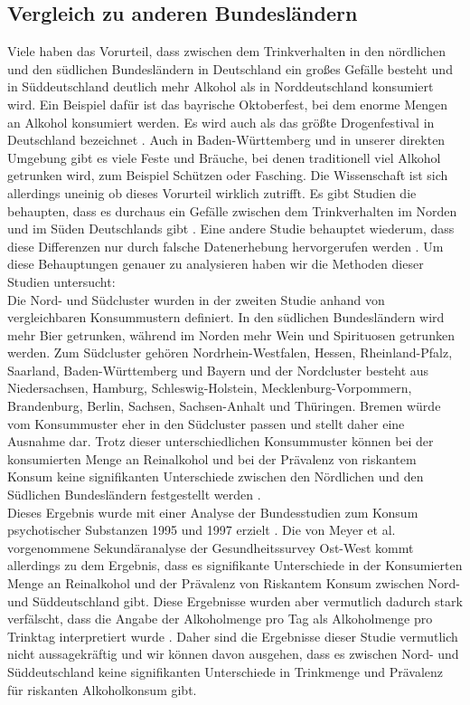 \documentclass[12pt]{article}
\begin{document}
\subsection{Vergleich zu anderen Bundesländern}
Viele haben das Vorurteil, dass zwischen dem Trinkverhalten in den nördlichen und den südlichen Bundesländern in Deutschland ein großes Gefälle besteht und in Süddeutschland deutlich mehr Alkohol als in Norddeutschland konsumiert wird. Ein Beispiel dafür ist das bayrische Oktoberfest, bei dem enorme Mengen an Alkohol konsumiert werden. Es wird auch als das größte Drogenfestival in Deutschland bezeichnet \autocite{effern_munchen_2023}. Auch in Baden-Württemberg und in unserer direkten Umgebung gibt es viele Feste und Bräuche, bei denen traditionell viel Alkohol getrunken wird, zum Beispiel Schützen oder Fasching. Die Wissenschaft ist sich allerdings uneinig ob dieses Vorurteil wirklich zutrifft. Es gibt Studien die behaupten, dass es durchaus ein Gefälle zwischen dem Trinkverhalten im Norden und im Süden Deutschlands gibt \autocite{meyer_regionale_1998}. Eine andere Studie behauptet wiederum, dass diese Differenzen nur durch falsche Datenerhebung hervorgerufen werden \autocite[781]{kraus_einfluss_2001}. Um diese Behauptungen genauer zu analysieren haben wir die Methoden dieser Studien untersucht: \\
Die Nord- und Südcluster wurden in der zweiten Studie anhand von vergleichbaren Konsummustern definiert. In den südlichen Bundesländern wird mehr Bier getrunken, während im Norden mehr Wein und Spirituosen getrunken werden. Zum Südcluster gehören Nordrhein-Westfalen, Hessen, Rheinland-Pfalz, Saarland, Baden-Württemberg und Bayern und der Nordcluster besteht aus Niedersachsen, Hamburg, Schleswig-Holstein, Mecklenburg-Vorpommern, Brandenburg, Berlin, Sachsen, Sachsen-Anhalt und Thüringen. Bremen würde vom Konsummuster eher in den Südcluster passen und stellt daher eine Ausnahme dar. Trotz dieser unterschiedlichen Konsummuster können bei der konsumierten Menge an Reinalkohol und bei der Prävalenz von riskantem Konsum keine signifikanten Unterschiede zwischen den Nördlichen und den Südlichen Bundesländern festgestellt werden \autocite[780]{kraus_einfluss_2001}.\\
Dieses Ergebnis wurde mit einer Analyse der Bundesstudien zum Konsum psychotischer Substanzen 1995 und 1997 erzielt \autocite[777]{kraus_einfluss_2001}. Die von Meyer et al. \autocite{meyer_regionale_1998} vorgenommene Sekundäranalyse der Gesundheitssurvey Ost-West kommt allerdings zu dem Ergebnis, dass es signifikante Unterschiede in der Konsumierten Menge an Reinalkohol und der Prävalenz von Riskantem Konsum zwischen Nord- und Süddeutschland gibt. Diese Ergebnisse wurden aber vermutlich dadurch stark verfälscht, dass die Angabe der Alkoholmenge pro Tag als Alkoholmenge pro Trinktag interpretiert wurde \autocite[781]{kraus_einfluss_2001}. Daher sind die Ergebnisse dieser Studie vermutlich nicht aussagekräftig und wir können davon ausgehen, dass es zwischen Nord- und Süddeutschland keine signifikanten Unterschiede in Trinkmenge und Prävalenz für riskanten Alkoholkonsum gibt.\\
\end{document}
